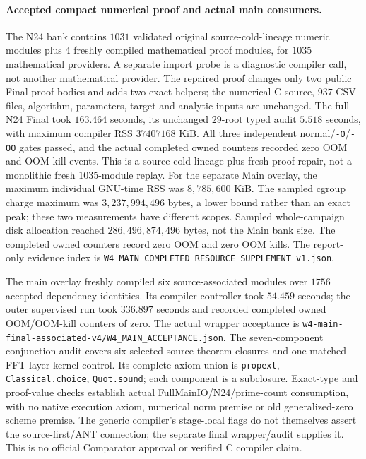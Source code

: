 \documentclass[11pt]{article}
\begin{document}
\paragraph{Accepted compact numerical proof and actual main consumers.}
The N24 bank contains \(1031\) validated original source-cold-lineage numeric
modules plus \(4\) freshly compiled mathematical proof modules, for
\(1035\) mathematical providers. A separate import probe is a diagnostic
compiler call, not another mathematical provider. The repaired proof changes
only two public Final proof bodies and adds two exact helpers; the numerical
C source, \(937\) CSV files, algorithm, parameters, target and analytic inputs
are unchanged. The full N24 Final took \(163.464\) seconds, its unchanged
\(29\)-root typed audit \(5.518\) seconds, with maximum compiler RSS
\(37407168\) KiB. All three independent normal/\texttt{-O}/\texttt{-OO}
gates passed, and the actual completed owned counters recorded zero OOM and
OOM-kill events. This is a source-cold lineage plus fresh proof repair,
not a monolithic fresh \(1035\)-module replay. For the separate Main overlay,
the maximum individual GNU-time RSS was \(8{,}785{,}600\) KiB. The sampled cgroup charge maximum
was \(3{,}237{,}994{,}496\) bytes, a lower bound rather than an exact peak;
these two measurements have different scopes. Sampled whole-campaign disk
allocation reached \(286{,}496{,}874{,}496\) bytes, not the Main bank size.
The completed owned counters record zero OOM and zero OOM kills.
The report-only evidence index is
\nolinkurl{W4_MAIN_COMPLETED_RESOURCE_SUPPLEMENT_v1.json}.

The main overlay freshly compiled six source-associated modules over
\(1756\) accepted dependency identities. Its compiler controller took
\(54.459\) seconds; the outer supervised run took \(336.897\) seconds and
recorded completed owned OOM/OOM-kill counters of zero. The actual wrapper
acceptance is \nolinkurl{w4-main-final-associated-v4/W4_MAIN_ACCEPTANCE.json}.
The seven-component conjunction audit covers six selected source theorem
closures and one matched FFT-layer kernel control. Its complete axiom union is
\texttt{propext}, \texttt{Classical.choice}, \texttt{Quot.sound}; each
component is a subclosure. Exact-type and proof-value checks establish
actual FullMainIO/N24/prime-count consumption, with no native execution
axiom, numerical norm premise or old generalized-zero scheme premise.
The generic compiler's stage-local flags do not themselves assert the
source-first/ANT connection; the separate final wrapper/audit supplies it.
This is no official Comparator approval or verified C compiler claim.
\end{document}
